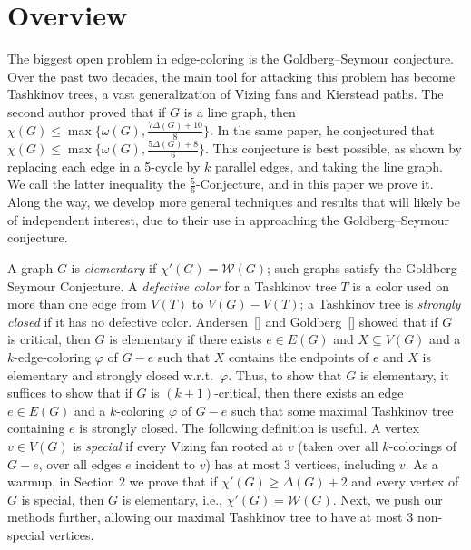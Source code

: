 \documentclass[12pt]{amsart}
\theoremstyle{plain}
\theoremstyle{definition}
\theoremstyle{remark}
\newcommand{\fancy}[1]{\mathcal{#1}}
\newcommand{\W}{\fancy{W}}
\newcommand{\vph}{\varphi}
\begin{document}
\section{Overview}

The biggest open problem in edge-coloring is the Goldberg--Seymour conjecture.
Over the past two decades, the main tool for attacking this problem has become
Tashkinov trees, a vast generalization of Vizing fans and Kierstead paths.
The second author proved that if $G$ is a line graph, then $\chi(G)\le
\max\{\omega(G),\frac{7\Delta(G)+10}{8}\}$.  In the same paper, he conjectured
that $\chi(G)\le \max\{\omega(G),\frac{5\Delta(G)+8}{6}\}$. This conjecture is best
possible, as shown by replacing each edge in a 5-cycle by $k$ parallel edges,
and taking the line graph.
We call the latter inequality the $\frac56$-Conjecture, and in this paper we prove
it.  Along the way, we develop more general techniques and results that will
likely be of independent interest, due to their use in approaching the
Goldberg--Seymour conjecture.

A graph $G$ is \emph{elementary} if $\chi'(G)=\W(G)$; such graphs satisfy the
Goldberg--Seymour Conjecture.  
A
\emph{defective color}
for a Tashkinov tree $T$ is a color used on more than one edge from $V(T)$ to
$V(G)-V(T)$; a Tashkinov tree is \emph{strongly closed} if it has no defective
color.  Andersen~[] and Goldberg~[] showed that if $G$ is critical, then $G$ is
elementary if there exists $e\in E(G)$ and $X\subseteq V(G)$ and a
$k$-edge-coloring $\vph$ of $G-e$ such that $X$ contains the endpoints of $e$
and $X$ is elementary and strongly closed w.r.t.~$\vph$.  Thus, to show that $G$
is elementary, it suffices to show that if $G$ is $(k+1)$-critical, then there
exists an edge $e\in E(G)$ and a $k$-coloring $\vph$ of $G-e$ such that some
maximal Tashkinov tree containing $e$ is strongly closed.  The following
definition is useful.  
A vertex $v \in V(G)$ is \emph{special} if every Vizing fan rooted at $v$ (taken over all
$k$-colorings of $G-e$, over all edges $e$ incident to $v$) has at most 3 vertices,
including $v$.
As a warmup, in Section 2 we prove that if $\chi'(G)\ge \Delta(G)+2$ and every
vertex of $G$ is special, then $G$ is elementary, i.e., $\chi'(G)=\W(G)$.  Next,
we push our methods further, allowing our maximal Tashkinov tree to have at most
3 non-special vertices.
\end{document}
